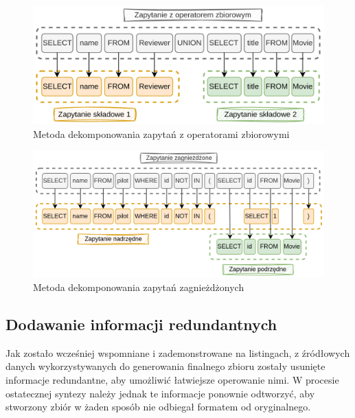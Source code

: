 
\begin{figure}[ht!]
  \centering
  \includegraphics[width=1.0\linewidth]{images/query_decomposition_serial.png}
  \caption{Metoda dekomponowania zapytań z operatorami zbiorowymi}
  \label{fig:query-decomposition-serial}
\end{figure}

\begin{figure}[ht!]
  \centering
  \includegraphics[width=1.0\linewidth]{images/query_decomposition_nested.png}
  \caption{Metoda dekomponowania zapytań zagnieżdżonych}
  \label{fig:query-decomposition-nested}
\end{figure}



\subsection{Dodawanie informacji redundantnych}
Jak zostało wcześniej wspomniane i zademonstrowane na listingach, z źródłowych danych wykorzystywanych do generowania finalnego zbioru zostały usunięte informacje redundantne, aby umożliwić łatwiejsze operowanie nimi. W procesie ostatecznej syntezy należy jednak te informacje ponownie odtworzyć, aby stworzony zbiór w żaden sposób nie odbiegał formatem od oryginalnego.

